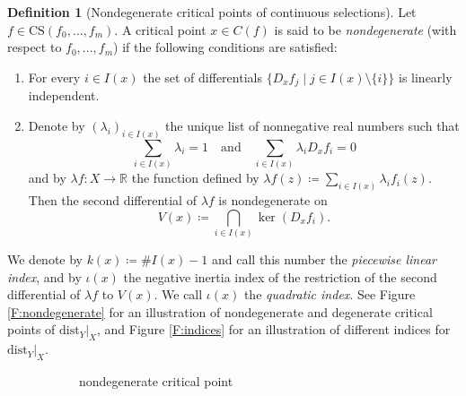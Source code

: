 \documentclass{amsart}
\newcommand{\R}{\mathbb{R}}
\newcommand{\dist}{{\mathrm{dist}_Y|_X}}
\def\lini{k}
\def\quadi{\iota}
\theoremstyle{definition}
\newtheorem{definition}[subsubsection]{Definition}
\theoremstyle{remark}
\begin{document}
\begin{definition}[Nondegenerate critical points of continuous selections]
\label{D:nondegenerate-crit-pt}
Let $f\in \mathrm{CS}(f_0, \ldots, f_m)$. A critical point $x\in C(f)$ is said to be \emph{nondegenerate} (with respect to $f_0, \ldots, f_m$) if the following conditions are satisfied:
\begin{enumerate}
\item For every $i\in I(x)$ the set of differentials $\{D_x f_j \mid j\in I(x)\setminus \{i\}\}$ is linearly independent.
\item Denote by $(\lambda_i)_{i\in I(x)}$ the unique list of nonnegative real numbers such that 
\[
\sum_{i \in I(x)} \lambda_i = 1
\quad \textrm{and} \quad
\sum_{i \in I(x)} \lambda_i D_x f_i = 0
\]
and by $\lambda f \colon X\to \R$ the function defined by $\lambda f(z)\coloneqq\sum_{i\in I(x)}\lambda_if_i(z).$ Then the second differential of $\lambda f$ is nondegenerate on 
\[
V(x) \coloneqq \bigcap_{i\in I(x)}\ker(D_xf_i).
\]
\end{enumerate}
We denote by $\lini(x)\coloneqq\#I(x)-1$ and call this number the \emph{piecewise linear index}, and by $\quadi(x)$ the negative inertia index of the restriction of the second differential of $\lambda f$ to $V(x)$. We call $\quadi(x)$ the \emph{quadratic index}. See Figure \ref{F:nondegenerate} for an illustration of nondegenerate and degenerate critical points of $\dist$, and Figure \ref{F:indices} for an illustration of different indices for $\dist$.

\begin{figure}
\captionsetup[subfigure]{justification=centering}
\renewcommand\thesubfigure{\scshape\alph{subfigure}}
\begin{subfigure}[t]{.3\textwidth}
\centering
{}
\caption{nondegenerate critical point}
\label{F:sub-nondegen}
\end{subfigure}
\begin{subfigure}[t]{.3\textwidth}
\centering
{}
\end{subfigure}
\end{figure}
\end{definition}
\end{document}
